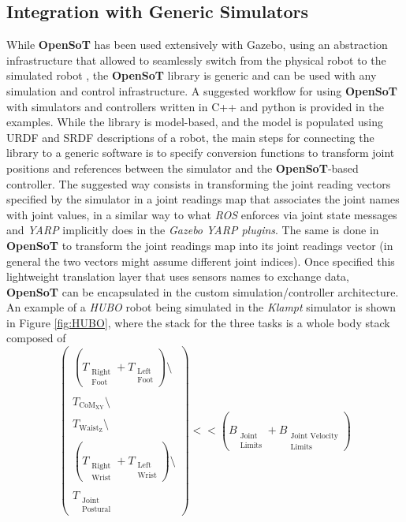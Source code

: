 \subsection{Integration with Generic Simulators}
While \textbf{OpenSoT} has been used extensively with Gazebo, using an abstraction infrastructure that allowed to seamlessly switch from the physical robot to the simulated robot \cite{hoffman2014yarp}, the \textbf{OpenSoT} library is generic and can be used with any simulation and control infrastructure.
A suggested workflow for using \textbf{OpenSoT} with simulators and controllers written in C++ and python is provided in the examples. While the library  is model-based, and the model is populated using URDF and SRDF descriptions of a robot, the main steps for connecting the library to a generic software is to specify conversion functions to transform joint positions and references between the simulator and the \textbf{OpenSoT}-based controller.
The suggested way consists in transforming the joint reading vectors specified by the simulator in a joint readings map that associates the joint names with joint values, in a similar way to what \emph{ROS} enforces via joint state messages and \emph{YARP} implicitly does in the \emph{Gazebo YARP plugins}. The same is done in \textbf{OpenSoT} to transform the joint readings map into its joint readings vector (in general the two vectors might assume different joint indices). Once specified this lightweight translation layer that uses sensors names to exchange data, \textbf{OpenSoT} can be encapsulated in the custom simulation/controller architecture. An example of a \emph{HUBO} robot being simulated in the \emph{Klampt} simulator is shown in Figure \ref{fig:HUBO}, where the stack for the three tasks is a whole body stack composed of
\begin{equation}
\begin{pmatrix}

\left(T_{\substack{\text{Right}\\\text{Foot}}} + T_{\substack{\text{Left}\\\text{Foot}}}\right)\setminus\\
\\
T_{\text{CoM}_\text{XY}}\setminus\\
\\
T_{\text{Waist}_\text{Z}}\setminus\\
\\
\left(T_{\substack{\text{Right}\\\text{Wrist}}} + T_{\substack{\text{Left}\\\text{Wrist}}}\right)\setminus\\
\\
T_{\substack{\text{Joint}\\\text{Postural}}}

\end{pmatrix}
<< \left(B_{\substack{\text{Joint}\\\text{Limits}}} + B_{\substack{\text{Joint Velocity}\\\text{Limits}}}\right)
\end{equation}
